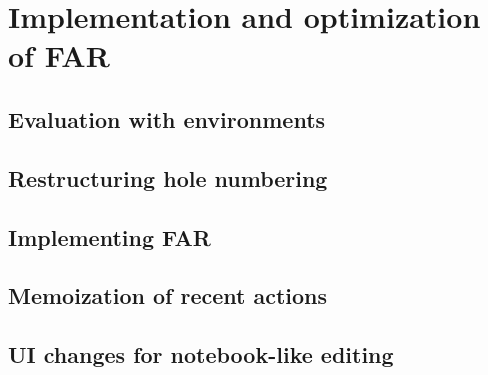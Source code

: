 \section{Implementation and optimization of FAR}
\label{sec:far_impl}

\subsection{Evaluation with environments}
\label{sec:eval_with_envs}

\subsection{Restructuring hole numbering}
\label{sec:restructuring_hole_numbering}

\subsection{Implementing FAR}
\label{sec:implementing_far}

\subsection{Memoization of recent actions}
\label{sec:memoization_actions}

\subsection{UI changes for notebook-like editing}
\label{sec:notebook_ui}

